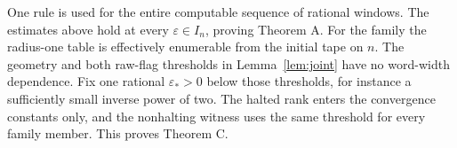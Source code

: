 One rule is used for the entire computable sequence of rational windows. The estimates above hold at every \(\varepsilon\in I_n\), proving Theorem A. For the family the radius-one table is effectively enumerable from the initial tape on \(n\). The geometry and both raw-flag thresholds in Lemma~\ref{lem:joint} have no word-width dependence. Fix one rational \(\varepsilon_*>0\) below those thresholds, for instance a sufficiently small inverse power of two. The halted rank enters the convergence constants only, and the nonhalting witness uses the same threshold for every family member. This proves Theorem C.
